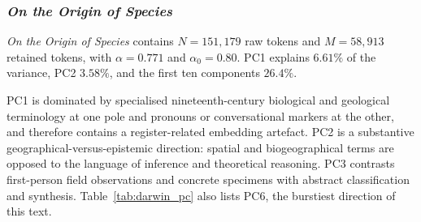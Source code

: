 \documentclass[preprint]{elsarticle}
\begin{document}
\subsubsection{\emph{On the Origin of Species}}
\label{sec:darwin}



\emph{On the Origin of Species} contains $N=151{,}179$ raw tokens and
$M=58{,}913$ retained tokens, with $\alpha=0.771$ and
$\alpha_0=0.80$. PC1 explains $6.61\%$ of the variance, PC2
$3.58\%$, and the first ten components $26.4\%$.

PC1 is dominated by specialised nineteenth-century biological and
geological terminology at one pole and pronouns or conversational
markers at the other, and therefore contains a register-related
embedding artefact. PC2 is a substantive geographical-versus-epistemic
direction: spatial and biogeographical terms are opposed to the
language of inference and theoretical reasoning. PC3 contrasts
first-person field observations and concrete specimens with abstract
classification and synthesis. Table~\ref{tab:darwin_pc} also lists PC6,
the burstiest direction of this text.
\end{document}
